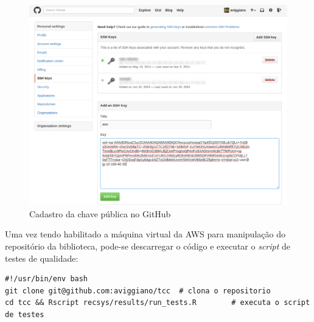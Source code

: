 \begin{figure}[htp]
    \begin{center}
    \includegraphics[width=1\textwidth]{img/github_key}
    \end{center}
    \caption{Cadastro da chave pública no GitHub}
    \label{fig:github_key}
\end{figure}

Uma vez tendo habilitado a máquina virtual da AWS para manipulação do repositório da biblioteca, pode-se descarregar o código e executar o \textit{script} de testes de qualidade:

\begin{lstlisting}[caption=Script de execução dos testes de qualidade]
#!/usr/bin/env bash
git clone git@github.com:aviggiano/tcc	# clona o repositorio
cd tcc && Rscript recsys/results/run_tests.R 		# executa o script de testes
\end{lstlisting}